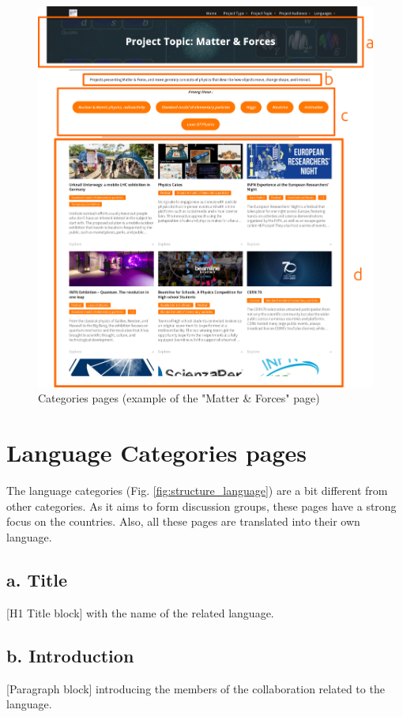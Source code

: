 \begin{figure}[p]
    \centering
    \includegraphics[width=\linewidth]{Image/Architecture/structure_category.png}
    \caption{Categories pages (example of the "Matter \& Forces" page)}
    \label{fig:structure_category}
\end{figure}
\newpage

\section{Language Categories pages}\label{sec:structure_language}

The language categories (Fig. \ref{fig:structure_language}) are a bit different from other categories. As it aims to form discussion groups, these pages have a strong focus on the countries. Also, all these pages are translated into their own language.

\subsection*{a. Title}
[H1 Title block] with the name of the related language.

\subsection*{b. Introduction}
[Paragraph block] introducing the members of the collaboration related to the language.

